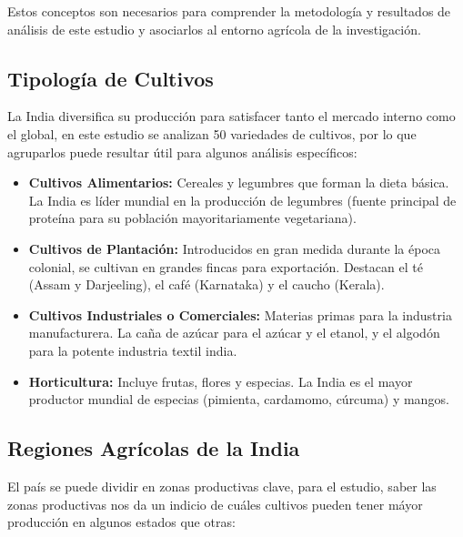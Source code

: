 \documentclass[oneside,11pt]{Latex/Classes/PhDthesisPSnPDF}
\begin{document}
Estos conceptos son necesarios para comprender la metodología y
resultados de análisis de este estudio y asociarlos al entorno agrícola
de la investigación.\\

\subsection{Tipología de Cultivos}

La India diversifica su producción para satisfacer tanto el mercado
interno como el global, en este estudio se analizan 50 variedades de
cultivos, por lo que agruparlos puede resultar útil para algunos
análisis específicos:

\begin{itemize}
 \item{\textbf{Cultivos Alimentarios:} Cereales y legumbres que forman la dieta básica. La India es líder mundial en la producción de legumbres (fuente principal de proteína para su población mayoritariamente vegetariana).}
 \item{\textbf{Cultivos de Plantación:} Introducidos en gran medida durante la época colonial, se cultivan en grandes fincas para exportación. Destacan el té (Assam y Darjeeling), el café (Karnataka) y el caucho (Kerala).}
 \item{\textbf{Cultivos Industriales o Comerciales:} Materias primas para la industria manufacturera. La caña de azúcar para el azúcar y el etanol, y el algodón para la potente industria textil india.}
 \item{\textbf{Horticultura:} Incluye frutas, flores y especias. La India es el mayor productor mundial de especias (pimienta, cardamomo, cúrcuma) y mangos.}
\end{itemize}

\hfill\break

\subsection{Regiones Agrícolas de la India}

El país se puede dividir en zonas productivas clave, para el estudio,
saber las zonas productivas nos da un indicio de cuáles cultivos pueden
tener máyor producción en algunos estados que otras:
\end{document}
